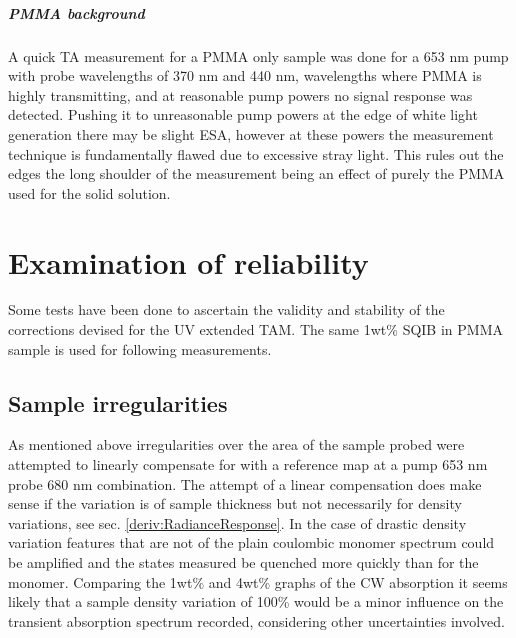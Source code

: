 \documentclass[twoside,openright]{scrreprt}
\begin{document}
\paragraph{PMMA background}
A quick TA measurement for a PMMA only sample was done for a 653 nm pump with probe wavelengths of 370 nm and 440 nm,  wavelengths where PMMA is highly transmitting, and at reasonable pump powers no signal response was detected. Pushing it to unreasonable pump powers at the edge of white light generation there may be slight ESA, however at these powers the measurement technique is fundamentally flawed due to excessive stray light. This rules out the edges the long shoulder of the measurement being an effect of purely the PMMA used for the solid solution.




\chapter{Examination of reliability}
Some tests have been done to ascertain the validity and stability of the corrections devised for the UV extended TAM. The same 1wt\% SQIB in PMMA sample is used for following measurements.
\section{Sample irregularities}
As mentioned above irregularities over the area of the sample probed were attempted to linearly compensate for with a reference map at a pump 653 nm probe 680 nm combination. The attempt of a linear compensation does make sense if the variation is of sample thickness but not necessarily for density variations, see sec. \ref{deriv:RadianceResponse}. In the case of drastic density variation features that are not of the plain coulombic monomer spectrum could be amplified and the states measured be quenched more quickly than for the monomer. Comparing the 1wt\% and 4wt\% graphs of the CW absorption it seems likely that a sample density variation of 100\% would be a minor influence on the transient absorption spectrum recorded, considering other uncertainties involved.
\end{document}
